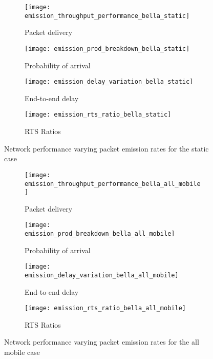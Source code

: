 \begin{figure}[tp!]
  \begin{subfigure}[t]{0.5\textwidth}
    \centering
    \texttt{[image: emission\_throughput\_performance\_bella\_static]}
    \caption{Packet delivery}
    \label{fig:emission_throughput_performance_bella_static}
  \end{subfigure}
  \begin{subfigure}[t]{0.5\textwidth}
    \centering
    \texttt{[image: emission\_prod\_breakdown\_bella\_static]}
    \caption{Probability of arrival}
    \label{fig:emission_prod_breakdown_bella_static}
  \end{subfigure}

  \begin{subfigure}[t]{0.5\textwidth}
    \centering
    \texttt{[image: emission\_delay\_variation\_bella\_static]}
    \caption{End-to-end delay}
    \label{fig:emission_delay_variation_bella_static}
  \end{subfigure}
  \begin{subfigure}[t]{0.5\textwidth}
    \centering
    \texttt{[image: emission\_rts\_ratio\_bella\_static]}
    \caption{RTS Ratios}
    \label{fig:emission_rts_ratio_bella_static}
  \end{subfigure}
  \caption{Network performance varying packet emission rates for the static case}
  \label{fig:emission_bella_static}
\end{figure}


\begin{figure}[bp!]
  \begin{subfigure}[t]{0.5\textwidth}
    \centering
    \texttt{[image: emission\_throughput\_performance\_bella\_all\_mobile]}
    \caption{Packet delivery}
    \label{fig:emission_throughput_performance_bella_all_mobile}
  \end{subfigure}
  \begin{subfigure}[t]{0.5\textwidth}
    \centering
    \texttt{[image: emission\_prod\_breakdown\_bella\_all\_mobile]}
    \caption{Probability of arrival}
    \label{fig:emission_prod_breakdown_bella_all_mobile}
  \end{subfigure}

  \begin{subfigure}[t]{0.5\textwidth}
    \centering
    \texttt{[image: emission\_delay\_variation\_bella\_all\_mobile]}
    \caption{End-to-end delay}
    \label{fig:emission_delay_variation_bella_all_mobile}
  \end{subfigure}
  \begin{subfigure}[t]{0.5\textwidth}
    \centering
    \texttt{[image: emission\_rts\_ratio\_bella\_all\_mobile]}
    \caption{RTS Ratios}
    \label{fig:emission_rts_ratio_bella_all_mobile}
  \end{subfigure}
  \caption{Network performance varying packet emission rates for the all mobile case}
  \label{fig:emission_bella_all_mobile}
\end{figure}


